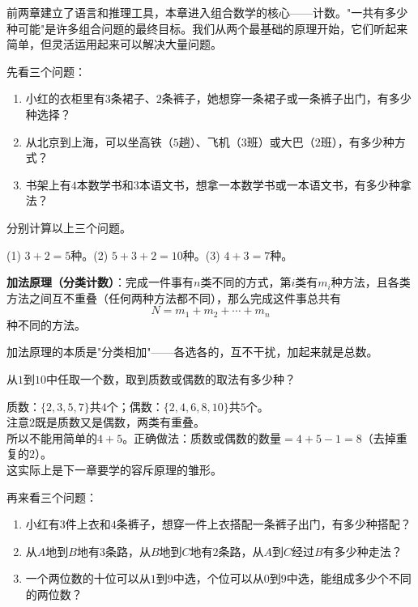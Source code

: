 
前两章建立了语言和推理工具，本章进入组合数学的核心——计数。"一共有多少种可能"是许多组合问题的最终目标。我们从两个最基础的原理开始，它们听起来简单，但灵活运用起来可以解决大量问题。


先看三个问题：
\begin{enumerate}
\item 小红的衣柜里有$3$条裙子、$2$条裤子，她想穿一条裙子或一条裤子出门，有多少种选择？
\item 从北京到上海，可以坐高铁（$5$趟）、飞机（$3$班）或大巴（$2$班），有多少种方式？
\item 书架上有$4$本数学书和$3$本语文书，想拿一本数学书或一本语文书，有多少种拿法？
\end{enumerate}

\begin{example}
分别计算以上三个问题。
\end{example}
\begin{solution}
(1) $3+2=5$种。\qquad (2) $5+3+2=10$种。\qquad (3) $4+3=7$种。
\end{solution}

\textbf{加法原理（分类计数）}：完成一件事有$n$类不同的方式，第$i$类有$m_i$种方法，且各类方法之间互不重叠（任何两种方法都不同），那么完成这件事总共有
\[
N = m_1 + m_2 + \cdots + m_n
\]
种不同的方法。

加法原理的本质是"分类相加"——各选各的，互不干扰，加起来就是总数。

\begin{example}
从$1$到$10$中任取一个数，取到质数或偶数的取法有多少种？
\end{example}
\begin{solution}
质数：$\{2,3,5,7\}$共$4$个；偶数：$\{2,4,6,8,10\}$共$5$个。\\
注意$2$既是质数又是偶数，两类有重叠。\\
所以不能用简单的$4+5$。正确做法：质数或偶数的数量$=4+5-1=8$（去掉重复的$2$）。\\
这实际上是下一章要学的容斥原理的雏形。
\end{solution}


再来看三个问题：
\begin{enumerate}
\item 小红有$3$件上衣和$4$条裤子，想穿一件上衣搭配一条裤子出门，有多少种搭配？
\item 从$A$地到$B$地有$3$条路，从$B$地到$C$地有$2$条路，从$A$到$C$经过$B$有多少种走法？
\item 一个两位数的十位可以从$1$到$9$中选，个位可以从$0$到$9$中选，能组成多少个不同的两位数？
\end{enumerate}

